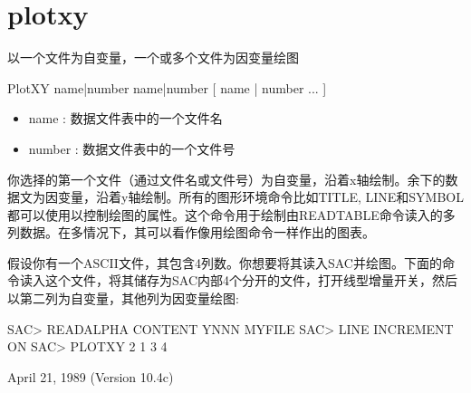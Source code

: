 \section{plotxy}
\label{cmd:plotxy}

以一个文件为自变量，一个或多个文件为因变量绘图

PlotXY name|number  name|number  [ name | number ... ]

\begin{itemize}
\item name : 数据文件表中的一个文件名 
\item number : 数据文件表中的一个文件号 
\end{itemize}

你选择的第一个文件（通过文件名或文件号）为自变量，沿着x轴绘制。余下的数据文为因变量，沿着y轴绘制。所有的图形环境命令比如TITLE, LINE和SYMBOL都可以使用以控制绘图的属性。这个命令用于绘制由READTABLE命令读入的多列数据。在多情况下，其可以看作像用绘图命令一样作出的图表。

假设你有一个ASCII文件，其包含4列数。你想要将其读入SAC并绘图。下面的命令读入这个文件，将其储存为SAC内部4个分开的文件，打开线型增量开关，然后以第二列为自变量，其他列为因变量绘图:
\begin{SACCode}
SAC> READALPHA CONTENT YNNN MYFILE
SAC> LINE INCREMENT ON
SAC> PLOTXY 2 1 3 4
\end{SACCode}

April 21, 1989 (Version 10.4c)
